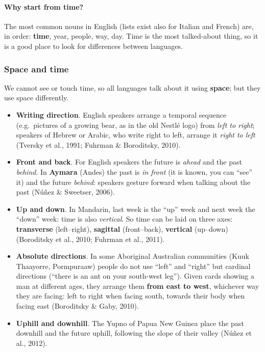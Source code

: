 \paragraph{Why start from time?}
The most common nouns in English (lists exist also for Italian and French) are, in order:
\textbf{time}, year, people, way, day. Time is the most talked-about thing, so it is a
good place to look for differences between languages.

\subsubsection{Space and time}

We cannot see or touch time, so all languages talk about it using \textbf{space}; but
they use space differently.
\begin{itemize}
  \item \textbf{Writing direction}. English speakers arrange a temporal sequence (e.g.\
        pictures of a growing bear, as in the old Nestlé logo) from \emph{left to right};
        speakers of Hebrew or Arabic, who write right to left, arrange it \emph{right to
        left} (Tversky et al., 1991; Fuhrman \& Boroditsky, 2010).
  \item \textbf{Front and back}. For English speakers the future is \emph{ahead} and the
        past \emph{behind}. In \textbf{Aymara} (Andes) the past is \emph{in front} (it
        is known, you can ``see'' it) and the future \emph{behind}: speakers gesture
        forward when talking about the past (Núñez \& Sweetser, 2006).
  \item \textbf{Up and down}. In Mandarin, last week is the ``up'' week and next week the
        ``down'' week: time is also \emph{vertical}. So time can be laid on three axes:
        \textbf{transverse} (left--right), \textbf{sagittal} (front--back),
        \textbf{vertical} (up--down) (Boroditsky et al., 2010; Fuhrman et al., 2011).
  \item \textbf{Absolute directions}. In some Aboriginal Australian communities
        (Kuuk Thaayorre, Pormpuraaw) people do not use ``left'' and ``right'' but
        cardinal directions (``there is an ant on your south-west leg''). Given cards
        showing a man at different ages, they arrange them \textbf{from east to west},
        whichever way they are facing: left to right when facing south, towards their
        body when facing east (Boroditsky \& Gaby, 2010).
  \item \textbf{Uphill and downhill}. The Yupno of Papua New Guinea place the past
        downhill and the future uphill, following the slope of their valley (Núñez et
        al., 2012).
\end{itemize}

